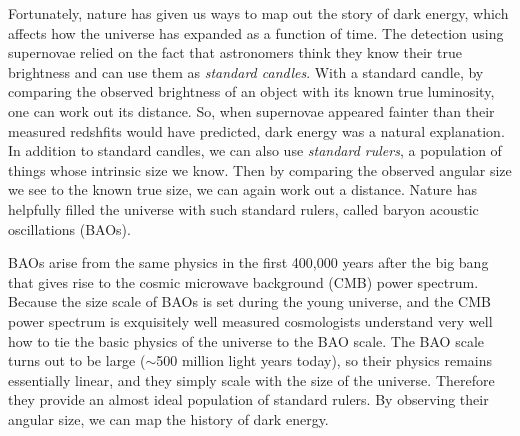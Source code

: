 \documentclass[letterpaper,11pt,preprint]{aastex}
\begin{document}
Fortunately, nature has given us ways to map out the story of dark
energy, which affects how the universe has expanded as a
function of time.  The detection using supernovae relied on
the fact that astronomers think they know their true brightness and
can use them as {\textit{standard candles}}.  With a standard candle,
by comparing the observed brightness of an object with its known true
luminosity, one can work out its distance.  So, when supernovae
appeared fainter than their measured redshfits would have predicted,
dark energy was a natural explanation.  In addition to standard
candles, we can also use {\textit{standard rulers}}, a population of
things whose intrinsic size we know.  Then by comparing the observed
angular size we see to the known true size, we can again work out a
distance.  Nature has helpfully filled the universe with such standard
rulers, called baryon acoustic oscillations (BAOs).  


BAOs arise from the same physics in the first 400,000 years after the
big bang that gives rise to the cosmic microwave background (CMB)
power spectrum.  Because the size scale of BAOs is set during the
young universe, and the CMB power spectrum is exquisitely well
measured \citep{PlanckSpectra2015,Louis2017,Henning2018} cosmologists
understand very well how to tie the basic physics of the universe to
the BAO scale.  The BAO scale turns out to be large ($\sim$500 million
light years today), so their physics remains essentially linear, and
they simply scale with the size of the universe.  Therefore they
provide an almost ideal population of standard rulers. By observing
their angular size, we can map the history of dark energy.
\end{document}
